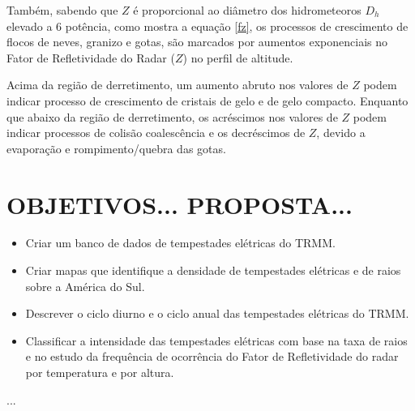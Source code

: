 
Também, sabendo que $Z$ é proporcional ao diâmetro dos hidrometeoros $D_h$ elevado a 6 potência, como mostra a equação \ref{fz}, os processos de crescimento de flocos de neves, granizo e gotas, são marcados por aumentos exponenciais no Fator de Refletividade do Radar ($Z$) no perfil de altitude. 


Acima da região de derretimento, um aumento abruto nos valores de $Z$ podem indicar processo de crescimento de cristais de gelo e de gelo compacto. Enquanto que abaixo da região de derretimento, os acréscimos nos valores de $Z$ podem indicar processos de colisão coalescência e os decréscimos de $Z$, devido a evaporação e rompimento/quebra das gotas. 





\section{OBJETIVOS... PROPOSTA...}
\begin{itemize}
\item Criar um banco de dados de tempestades elétricas do TRMM. 
\item Criar mapas que identifique a densidade de tempestades elétricas e de raios sobre a América do Sul.
\item Descrever o ciclo diurno e o ciclo anual das tempestades elétricas do TRMM.
\item Classificar a intensidade das tempestades elétricas com base na taxa de raios e no estudo da frequência de ocorrência do Fator de Refletividade do radar por temperatura e por altura. 
\end{itemize}
...